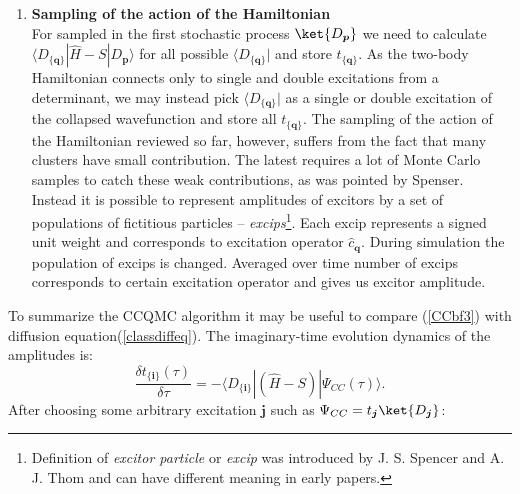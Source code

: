 \documentclass[twoside,english]{uiofysmaster}
\begin{document}
\begin{enumerate}
	\item
	\textbf{Sampling of the action of the Hamiltonian}\\
	 For sampled in the first stochastic process $\ket{D_{\boldsymbol{p}}}$ we need to calculate  $\langle D_{\{\boldsymbol{q}\}}|\hat{H}-S|D_{\boldsymbol{p}}\rangle$ for all possible $\langle D_{\{\boldsymbol{q}\}}|$ and store $t_{\{\boldsymbol{q}\}}$. As the two-body Hamiltonian connects only to single and double excitations from a determinant, we may instead pick $\langle D_{\{\boldsymbol{q}\}}|$ as a single or double excitation of the collapsed wavefunction and store all $t_{ \{ \boldsymbol{q} \} }$.
	 The sampling of the action of the Hamiltonian reviewed so far, however, suffers from the fact that many clusters have small contribution. The latest requires a lot of Monte Carlo samples to catch these weak contributions, as was pointed by Spenser\cite{ThomStochasticCoupledCluster2010}. Instead it is possible to represent amplitudes of excitors by a set of populations of fictitious particles -- \textit{excips}\footnote{Definition of \textit{excitor particle} or \textit{excip} was introduced by J. S. Spencer and A. J. Thom \cite{SpencerDevelopmentsstochasticcoupled2016} and can have different meaning in early papers.}. Each excip represents a signed unit weight and corresponds to excitation operator $\hat{c}_{\boldsymbol{q}}$. During simulation the population of excips is changed. Averaged over time number of excips corresponds to certain excitation operator and gives us excitor amplitude.
	
\end{enumerate}	

To summarize the CCQMC algorithm it may be useful to compare (\ref{CCbf3}) with diffusion equation(\ref{classdiffeq}). The imaginary-time evolution dynamics of the amplitudes is: 
\begin{equation}\label{common0}
\frac{\delta t_{\{\boldsymbol{i}\}}(\tau)}{\delta \tau} = - \langle D_{\{\boldsymbol{i}\}}|(\hat{H}-S)|\Psi_{CC}(\tau)\rangle.
\end{equation}
After choosing some arbitrary excitation $\boldsymbol{j}$ such as $\Psi_{CC} = t_{\boldsymbol{j}}\ket{D_{\boldsymbol{j}}}$:
\end{document}
